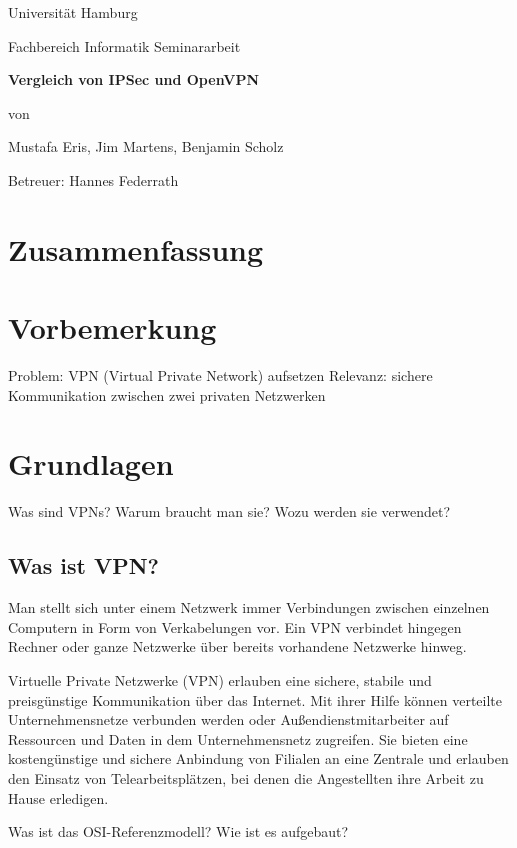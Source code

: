 \documentclass[12pt]{scrartcl}
\begin{document}
\newpage
\thispagestyle{empty}
\begin{center}\Large
Universität Hamburg \par
Fachbereich Informatik
\vfill
Seminararbeit
\vfill
{\Large\textsf{\textbf{Vergleich von IPSec und OpenVPN}}\par}
\vfill
von 
\par\bigskip
Mustafa Eris, Jim Martens, Benjamin Scholz \par
Betreuer: Hannes Federrath \par
\end{center}

\newpage
\section*{Zusammenfassung}


\newpage
\tableofcontents

\newpage
\section{Vorbemerkung}
Problem: VPN (Virtual Private Network) aufsetzen
Relevanz: sichere Kommunikation zwischen zwei privaten Netzwerken
\section{Grundlagen}
Was sind VPNs? Warum braucht man sie? Wozu werden sie verwendet?

\subsection{Was ist VPN?}
Man stellt sich unter einem Netzwerk immer Verbindungen zwischen einzelnen Computern in Form von Verkabelungen vor. Ein VPN verbindet hingegen Rechner oder ganze Netzwerke über bereits vorhandene Netzwerke hinweg.

Virtuelle Private Netzwerke (VPN) erlauben eine sichere, stabile und preisgünstige Kommunikation über das Internet. Mit ihrer Hilfe können verteilte Unternehmensnetze verbunden werden oder Außendienstmitarbeiter auf Ressourcen und Daten in dem Unternehmensnetz zugreifen. Sie bieten eine kostengünstige und sichere Anbindung von Filialen an eine Zentrale und erlauben den Einsatz von Telearbeitsplätzen, bei denen die Angestellten ihre Arbeit zu Hause erledigen.

Was ist das OSI-Referenzmodell? Wie ist es aufgebaut?
\end{document}
